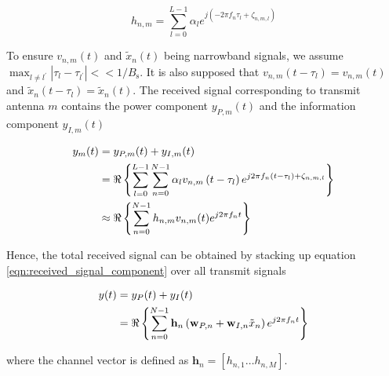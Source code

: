 \begin{equation}\label{eqn:channel}
  {h_{n,m}} = \sum\limits_{l = 0}^{L - 1} {{\alpha _l}{e^{j\left( { - 2\pi {f_n}{\tau _l} + {\zeta _{n,m,l}}} \right)}}}
\end{equation}

To ensure $v_{n, m}(t)$ and $\tilde{x}_{n}(t)$ being narrowband signals, we assume ${\max _{l \ne {l^\prime }}}\left| {{\tau _l} - {\tau _{{l^\prime }}}} \right| <  < 1/{B_{\text{s}}}$. It is also supposed that ${v_{n,m}}\left( {t - {\tau _l}} \right) = {v_{n,m}}(t)$ and ${{\tilde x}_n}\left( {t - {\tau _l}} \right) = {{\tilde x}_n}(t)$. The received signal corresponding to transmit antenna $m$ contains the power component $y_{P, m}(t)$ and the information component $y_{I, m}(t)$

\begin{align}\label{eqn:received_signal_component}
  {y_m}(t) &= {y_{P,m}}(t) + {y_{I,m}}(t) \hfill \\
   &= \Re \left\{ {\sum\limits_{l = 0}^{L - 1} {\sum\limits_{n = 0}^{N - 1} {{\alpha _l}} } {v_{n,m}}\left( {t - {\tau _l}} \right){e^{j2\pi {f_n}\left( {t - {\tau _l}} \right) + {\zeta _{n,m,l}}}}} \right\} \hfill \\
   &\approx \Re \left\{ {\sum\limits_{n = 0}^{N - 1} {{h_{n,m}}} {v_{n,m}}(t){e^{j2\pi {f_n}t}}} \right\} \hfill
\end{align}

Hence, the total received signal can be obtained by stacking up equation \ref{eqn:received_signal_component} over all transmit signals

\begin{align}\label{eqn:received_signal}
  y(t) &= {y_P}(t) + {y_I}(t) \hfill \\
   &= \Re \left\{ {\sum\limits_{n = 0}^{N - 1} {{{\mathbf{h}}_n}} \left( {{{\mathbf{w}}_{P,n}} + {{\mathbf{w}}_{I,n}}{{\tilde x}_n}} \right){e^{j2\pi {f_n}t}}} \right\} \hfill
\end{align}

where the channel vector is defined as ${{\mathbf{h}}_n} = \left[ {{h_{n,1}} \ldots {h_{n,M}}} \right]$. 